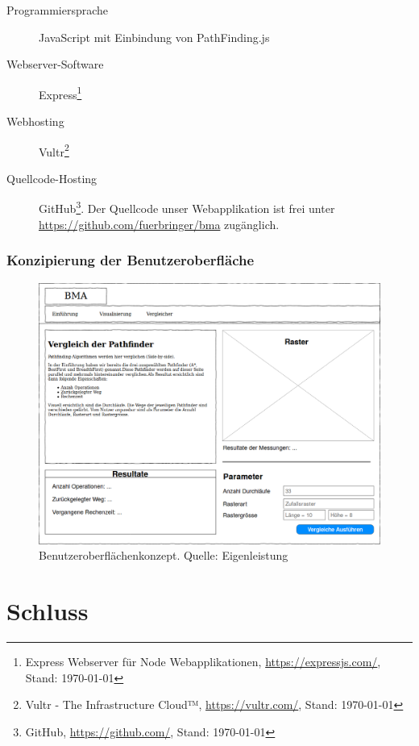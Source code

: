 \documentclass[12pt,a4paper,german]{report}
\begin{document}
\begin{description}
  \item [Programmiersprache] JavaScript mit Einbindung von PathFinding.js \cite{pfjs}
  \item [Webserver-Software] Express\footnote{Express Webserver für Node Webapplikationen, \url{https://expressjs.com/}, Stand: \today}
  \item [Webhosting] Vultr\footnote{Vultr - The Infrastructure Cloud™, \url{https://vultr.com/}, Stand: \today}
  \item [Quellcode-Hosting] GitHub\footnote{GitHub, \url{https://github.com/}, Stand: \today}. Der Quellcode unser Webapplikation ist frei unter \url{https://github.com/fuerbringer/bma} zugänglich.
\end{description}

\subsection{Konzipierung der Benutzeroberfläche}
\begin{figure}
  \centering
  \includegraphics[width=16cm]{konzept1}
  \caption[Benutzeroberflächenkonzept des Pathfinder-Vergleichers.]{Benutzeroberflächenkonzept. Quelle: Eigenleistung}
  \label{fig:gui_konzept}
\end{figure}

\chapter{Schluss}
\blindtext


\clearpage



\listoffigures
\end{document}
